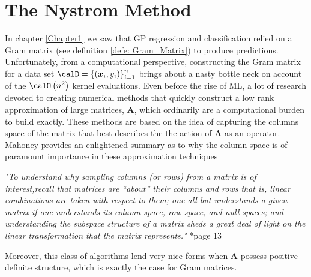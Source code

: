 \section{The Nystrom Method}\label{Chapter2}
In chapter \ref{Chapter1} we saw that GP regression and classification relied on a Gram matrix (see definition \ref{defe: Gram_Matrix}) to produce predictions. Unfortunately, from a computational perspective, constructing the Gram matrix for a data set $\calD = \left\{ \left( \bm{x}_i , y_{i} \right) \right\}_{i=1}^{n}$ brings about a nasty bottle neck on account of the $\calO \left( n^2 \right)$ kernel evaluations. Even before the rise of ML, a lot of research devoted to creating numerical methods that quickly construct a low rank approximation of large matrices, $\bm{A}$, which ordinarily are a computational burden to build exactly. These methods are based on the idea of capturing the columns space of the matrix that best describes the the action of $\bm{A}$ as an operator. Mahoney provides an enlightened summary as to why the column space is of paramount importance in these approximation techniques
\begin{center}
    \emph{"To understand why sampling columns (or rows) from a matrix is of interest,recall that matrices are “about” their columns and rows that is, linear combinations are taken with respect to them; one all but understands a given matrix if one understands its column space, row space, and null
        spaces; and understanding the subspace structure of a matrix sheds a great deal of light on the linear transformation that the matrix represents."} \cite{DBLP:journals/corr/abs-1104-5557}*{page 13}
\end{center}
Moreover, this class of algorithms lend very nice forms when $\bm{A}$ possess positive definite structure, which is exactly the case for Gram matrices.





